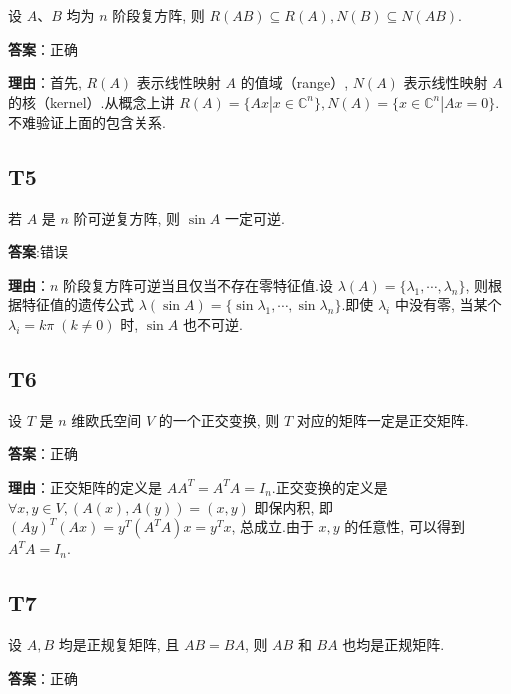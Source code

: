 \documentclass{article}
\begin{document}
\par 设 $A、B$ 均为 $n$ 阶段复方阵, 则 $R(AB)\subseteq R(A), N(B)\subseteq N(AB)$.

\par \textbf{答案}：正确

\par \textbf{理由}：首先,  $R(A)$ 表示线性映射 $A$ 的值域（range）, $N(A)$ 表示线性映射 $A$ 的核（kernel）.从概念上讲 $R(A)=\{Ax | x\in \mathbb C^n\}, N(A)=\{x\in \mathbb C^n|Ax=0\}$.不难验证上面的包含关系.

\subsection{T5}

\par 若 $A$ 是 $n$ 阶可逆复方阵, 则 $\sin A$ 一定可逆.

\par \textbf{答案}:错误

\par \textbf{理由}：$n$ 阶段复方阵可逆当且仅当不存在零特征值.设 $\lambda(A)=\{\lambda_1, \cdots, \lambda_n\}$, 则根据特征值的遗传公式 $\lambda(\sin A)=\{\sin \lambda_1, \cdots, \sin \lambda_n\}$.即使 $\lambda_i$ 中没有零, 当某个 $\lambda_i=k\pi\;(k\neq 0)$ 时, $\sin A$ 也不可逆.

\subsection{T6}

\par 设 $T$ 是 $n$ 维欧氏空间 $V$ 的一个正交变换, 则 $T$ 对应的矩阵一定是正交矩阵.

\par \textbf{答案}：正确

\par \textbf{理由}：正交矩阵的定义是 $AA^T=A^TA=I_n$.正交变换的定义是 $\forall x, y\in V, (A(x), A(y))=(x, y)$ 即保内积, 即 $(Ay)^T(Ax)=y^T(A^TA)x=y^Tx$, 总成立.由于 $x, y$ 的任意性, 可以得到 $A^TA=I_n$.

\subsection{T7}

\par 设 $A, B$ 均是正规复矩阵, 且 $AB=BA$, 则 $AB$ 和 $BA$ 也均是正规矩阵.

\par \textbf{答案}：正确
\end{document}
